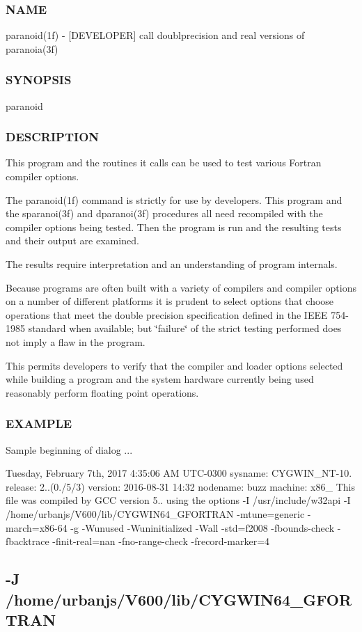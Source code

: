 \subsubsection*{N\+A\+ME}

paranoid(1f) -\/ \mbox{[}D\+E\+V\+E\+L\+O\+P\+ER\mbox{]} call doublprecision and real versions of paranoia(3f) \subsubsection*{S\+Y\+N\+O\+P\+S\+IS}

paranoid \subsubsection*{D\+E\+S\+C\+R\+I\+P\+T\+I\+ON}

This program and the routines it calls can be used to test various Fortran compiler options.

The paranoid(1f) command is strictly for use by developers. This program and the sparanoi(3f) and dparanoi(3f) procedures all need recompiled with the compiler options being tested. Then the program is run and the resulting tests and their output are examined.

The results require interpretation and an understanding of program internals.

Because programs are often built with a variety of compilers and compiler options on a number of different platforms it is prudent to select options that choose operations that meet the double precision specification defined in the I\+E\+EE 754-\/1985 standard when available; but \char`\"{}failure\char`\"{} of the strict testing performed does not imply a flaw in the program.

This permits developers to verify that the compiler and loader options selected while building a program and the system hardware currently being used reasonably perform floating point operations.

\subsubsection*{E\+X\+A\+M\+P\+LE}

Sample beginning of dialog ... 

 Tuesday, February 7th, 2017 4\+:35\+:06 AM U\+T\+C-\/0300 sysname\+: C\+Y\+G\+W\+I\+N\+\_\+\+N\+T-\/10. release\+: 2..(0./5/3) version\+: 2016-\/08-\/31 14\+:32 nodename\+: buzz machine\+: x86\+\_ This file was compiled by G\+CC version 5.. using the options -\/I /usr/include/w32api -\/I /home/urbanjs/\+V600/lib/\+C\+Y\+G\+W\+I\+N64\+\_\+\+G\+F\+O\+R\+T\+R\+AN -\/mtune=generic -\/march=x86-\/64 -\/g -\/\+Wunused -\/\+Wuninitialized -\/\+Wall -\/std=f2008 -\/fbounds-\/check -\/fbacktrace -\/finit-\/real=nan -\/fno-\/range-\/check -\/frecord-\/marker=4 \subsection*{-\/J /home/urbanjs/\+V600/lib/\+C\+Y\+G\+W\+I\+N64\+\_\+\+G\+F\+O\+R\+T\+R\+AN }

